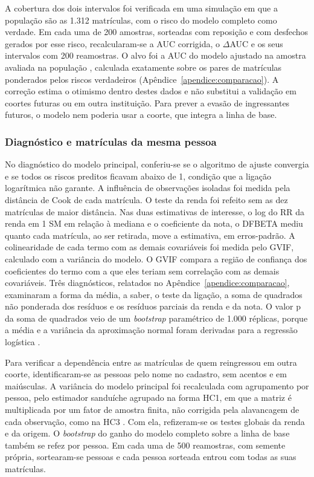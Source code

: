 \documentclass[12pt,a4paper]{article}
\begin{document}
A cobertura dos dois intervalos foi verificada em uma simulação em que a população são as 1.312 matrículas, com o risco do modelo completo como verdade. Em cada uma de 200 amostras, sorteadas com reposição e com desfechos gerados por esse risco, recalcularam-se a AUC corrigida, o $\Delta$AUC e os seus intervalos com 200 reamostras. O alvo foi a AUC do modelo ajustado na amostra avaliada na população \citep[pp.~13--17]{noma2021confidence}, calculada exatamente sobre os pares de matrículas ponderados pelos riscos verdadeiros (Apêndice~\ref{apendice:comparacao}). A correção estima o otimismo dentro destes dados e não substitui a validação em coortes futuras ou em outra instituição. Para prever a evasão de ingressantes futuros, o modelo nem poderia usar a coorte, que integra a linha de base.

\subsubsection{Diagnóstico e matrículas da mesma pessoa}
\label{sec:verificacoes}

No diagnóstico do modelo principal, conferiu-se se o algoritmo de ajuste convergia e se todos os riscos preditos ficavam abaixo de 1, condição que a ligação logarítmica não garante. A influência de observações isoladas foi medida pela distância de Cook de cada matrícula. O teste da renda foi refeito sem as dez matrículas de maior distância. Nas duas estimativas de interesse, o log do RR da renda em 1 SM em relação à mediana e o coeficiente da nota, o DFBETA mediu quanto cada matrícula, ao ser retirada, move a estimativa, em erros-padrão. A colinearidade de cada termo com as demais covariáveis foi medida pelo GVIF, calculado com a variância do modelo. O GVIF compara a região de confiança dos coeficientes do termo com a que eles teriam sem correlação com as demais covariáveis. Três diagnósticos, relatados no Apêndice~\ref{apendice:comparacao}, examinaram a forma da média, a saber, o teste da ligação, a soma de quadrados não ponderada dos resíduos e os resíduos parciais da renda e da nota. O valor p da soma de quadrados veio de um \textit{bootstrap} paramétrico de 1.000 réplicas, porque a média e a variância da aproximação normal foram derivadas para a regressão logística \citep[pp.~977--978]{hosmer1997comparison}.

Para verificar a dependência entre as matrículas de quem reingressou em outra coorte, identificaram-se as pessoas pelo nome no cadastro, sem acentos e em maiúsculas. A variância do modelo principal foi recalculada com agrupamento por pessoa, pelo estimador sanduíche agrupado na forma HC1, em que a matriz é multiplicada por um fator de amostra finita, não corrigida pela alavancagem de cada observação, como na HC3 \citep[pp.~3--4]{zeileis2004econometric}. Com ela, refizeram-se os testes globais da renda e da origem. O \textit{bootstrap} do ganho do modelo completo sobre a linha de base também se refez por pessoa. Em cada uma de 500 reamostras, com semente própria, sortearam-se pessoas e cada pessoa sorteada entrou com todas as suas matrículas.
\end{document}
